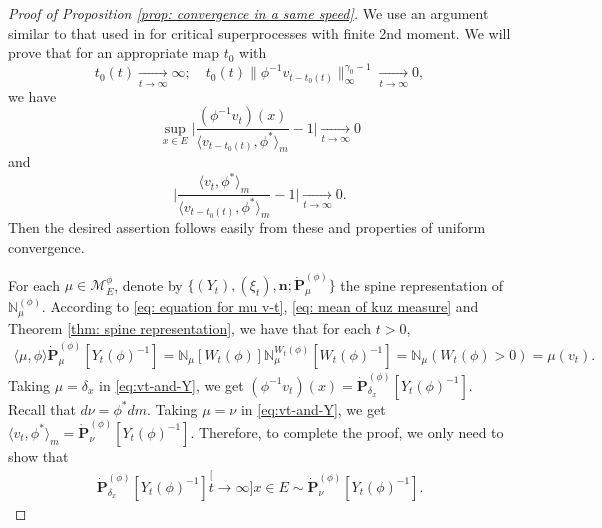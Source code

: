 \documentclass[12pt,a4paper]{amsart}
\theoremstyle{definition}
\numberwithin{equation}{section}
\begin{document}
\begin{proof}
  [Proof of Proposition \ref{prop: convergence in a same speed}]
	We use an argument similar to that used in \cite{RenSongSun2017Spine} for critical superprocesses with finite 2nd moment.
We will prove that for an appropriate map $t_0$ with
$$
	t_0(t)
	\xrightarrow[t\to\infty]{} \infty;
	\quad t_0(t)\| \phi^{-1}v_{t-t_0(t)}\|^{\gamma_0 - 1}_\infty
	\xrightarrow[t\to\infty]{} 0,
$$	
we have
$$
\sup_{x\in E}\Big|\frac{(\phi^{-1}v_t)(x)}{\langle v_{t-t_0(t)},\phi^* \rangle_m}-1 \Big|
	\xrightarrow[t\to\infty]{} 0
$$
and
$$
\Big |\frac {\langle v_t, \phi^*\rangle_m} {\langle v_{t-t_0(t)} , \phi^*\rangle_m} - 1 \Big |
     \xrightarrow[t\to\infty]{} 0.
$$
Then the desired assertion follows easily from these and properties of uniform convergence.
	
For each $\mu\in\mathcal M^\phi_E$, denote by $\{(Y_t), (\xi_t),\mathbf n; \dot {\mathbf P}^{(\phi)}_\mu\}$ the spine representation of $\mathbb N^{(\phi)}_\mu$.
	According to \eqref	{eq: equation for mu v-t}, \eqref{eq: mean of kuz measure} and Theorem \ref{thm: spine representation}, we have that for each $t>0$,
\begin{align}
\label{eq:vt-and-Y}
	\langle \mu,\phi \rangle \dot {\mathbf P}^{(\phi)}_\mu [Y_t(\phi)^{-1}]
	= \mathbb N_\mu[W_t(\phi)] \mathbb N^{W_t(\phi)}_\mu [W_t(\phi)^{-1}]
	= \mathbb N_\mu(W_t(\phi) > 0)
	= \mu(v_t).
\end{align}
Taking $\mu = \delta_x$ in \eqref{eq:vt-and-Y}, we get $(\phi^{-1}v_t)(x) =\dot{\mathbf P}_{\delta_x}^{(\phi)}[Y_t(\phi)^{-1}]$.
Recall that $d\nu = \phi^* dm$.
Taking $\mu = \nu$ in \eqref{eq:vt-and-Y}, we get $\langle v_t, \phi^*\rangle_m = \dot {\mathbf P}_{\nu}^{(\phi)} [Y_t(\phi)^{-1}]$.
Therefore, to complete the proof, we only need to show that
\begin{align}
  \label{eq:desired_for_main_theorem_2}
	\dot{\mathbf P}_{\delta_x}^{(\phi)}[Y_t(\phi)^{-1}]
	\stackrel[t\to \infty]{x\in E}{\sim}  \dot {\mathbf P}_\nu^{(\phi)} [Y_t(\phi)^{-1}].
\end{align}



\end{proof}
\end{document}
